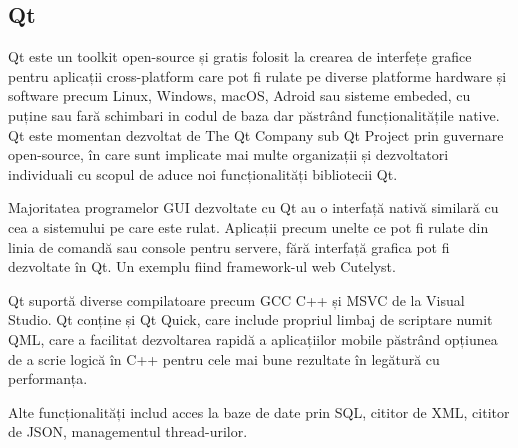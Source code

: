 \subsection{Qt}

Qt este un toolkit open-source și gratis folosit la crearea de interfețe grafice pentru aplicații cross-platform care 
pot fi rulate pe diverse platforme hardware și software precum Linux, Windows, macOS, Adroid sau sisteme embeded, 
cu puține sau fară schimbari in codul de baza dar păstrând funcționalitățile native. Qt este momentan dezvoltat 
de The Qt Company sub Qt Project prin guvernare open-source, în care sunt implicate mai multe organizații și dezvoltatori 
individuali cu scopul de aduce noi funcționalități bibliotecii Qt.\newline

Majoritatea programelor GUI dezvoltate cu Qt au o interfață nativă similară cu cea a sistemului pe care este rulat. 
Aplicații precum unelte ce pot fi rulate din linia de comandă sau console pentru servere, fără interfață grafica pot fi 
dezvoltate în Qt. Un exemplu fiind framework-ul web Cutelyst.\newline

Qt suportă diverse compilatoare precum GCC C++ și MSVC de la Visual Studio. Qt conține și Qt Quick, care include propriul 
limbaj de scriptare numit QML, care a facilitat dezvoltarea rapidă a aplicațiilor mobile păstrând opțiunea de a scrie 
logică în C++ pentru cele mai bune rezultate în legătură cu performanța.\newline

Alte funcționalități includ acces la baze de date prin SQL, cititor de XML, cititor de JSON, managementul thread-urilor. \cite{qtwiki}\newline

